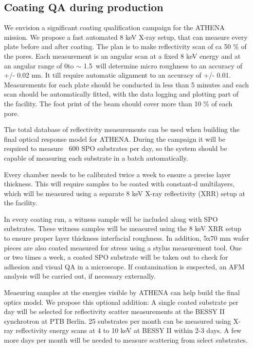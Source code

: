 \subsection{Coating QA during production}\label{qualification}
We envision a significant coating qualification campaign for the ATHENA mission. We propose a fast automated 8 keV X-ray setup, that can measure every plate before and after coating. The plan is to make reflectivity scan of ca 50 \% of the pores.  Each measurement is an angular scan  at a fixed 8 keV energy and at an angular range of 0\degr to $\sim$ 1.5\degr\ will determine micro roughness to an accuracy of +/- 0.02 nm. It till require automatic alignment to an accuracy of +/- 0.01\degr. Measurements for each plate should be conducted in less than 5 minutes and each scan should be automatically fitted, with the data logging and plotting part of the facility. The foot print of the beam should cover more than 10 \% of each pore.

The total database of reflectivity measurements can be used when building the final optical response model for ATHENA. During the campaign it will be required to measure ~600 SPO substrates per day, so the system should be capable of measuring each substrate in a batch automatically.

Every chamber needs to be calibrated twice a week to ensure a precise layer thickness. This will require samples to be coated with constant-d multilayers, which will be measured using a separate 8 keV X-ray reflectivity (XRR) setup at the facility.

In every coating run, a witness sample will be included along with SPO substrates. These witness samples will be measured using the 8 keV XRR setup to ensure proper layer thickness interfacial roughness. In addition, 5x70 mm wafer pieces are also coated measured for stress using a stylus measurement tool. One or two times a week, a coated SPO substrate will be taken out to check for adhesion and visual QA in a microscope. If contamination is suspected, an AFM analysis will be carried out, if necessary externally.

Measuring samples at the energies visible by ATHENA can help build the final optics model. We propose this optional addition: A single coated substrate per day will be selected for reflectivity scatter measurements at the BESSY II synchrotron at PTB Berlin. 25 substrates per month can be measured using X-ray reflectivity energy scans at 4 to 10 keV at BESSY II within 2-3 days. A few more days per month will be needed to measure scattering from select substrates.

